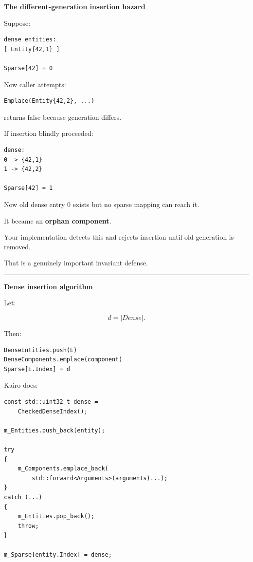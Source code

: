 \textbf{The different-generation insertion hazard}

Suppose:

\begin{verbatim}
dense entities:
[ Entity{42,1} ]

Sparse[42] = 0
\end{verbatim}

Now caller attempts:

\begin{verbatim}
Emplace(Entity{42,2}, ...)
\end{verbatim}

 returns false because generation differs.

If insertion blindly proceeded:

\begin{verbatim}
dense:
0 -> {42,1}
1 -> {42,2}

Sparse[42] = 1
\end{verbatim}

Now old dense entry 0 exists but no sparse mapping can reach it.

It became an \textbf{orphan component}.

Your implementation detects this and rejects insertion until old generation is removed.

That is a genuinely important invariant defense.

\begin{center}\rule{0.5\linewidth}{0.5pt}\end{center}

\textbf{Dense insertion algorithm}

Let:

\[
d=|Dense|.
\]

Then:

\begin{verbatim}
DenseEntities.push(E)
DenseComponents.emplace(component)
Sparse[E.Index] = d
\end{verbatim}

Kairo does:

\begin{verbatim}
const std::uint32_t dense =
    CheckedDenseIndex();

m_Entities.push_back(entity);

try
{
    m_Components.emplace_back(
        std::forward<Arguments>(arguments)...);
}
catch (...)
{
    m_Entities.pop_back();
    throw;
}

m_Sparse[entity.Index] = dense;
\end{verbatim}

